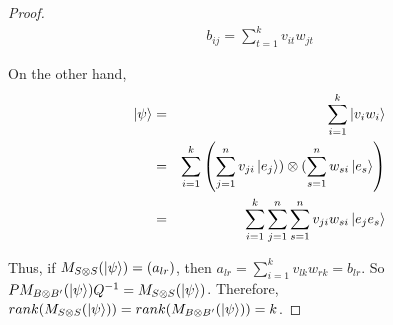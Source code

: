 \begin{proof}
\begin{comment}
=\begin{pmatrix}
\ket{v_1} && \ket{v_2} && \hdots && \ket{v_n}
\end{pmatrix}
\begin{pmatrix}
\text{---} && \ket{w_1}^T &&\text{---} \\
\text{---} && \ket{w_2}^T &&\text{---} \\
\vdots && \vdots && \vdots \\
\text{---} && \ket{w_k}^T &&\text{---} \\
\text{---} && 0 &&\text{---}
\end{pmatrix}\\
=\begin{pmatrix}
v_{11}w_{11}+\hdots+v_{1k}w_{1k} && v_{11}w_{21}+\hdots+v_{1k}w_{2k} && \hdots && v_{11}w_{n1}+\hdots+v_{1k}w_{nk}\\
v_{21}w_{11}+\hdots+v_{2k}w_{1k} && v_{21}w_{21}+\hdots+v_{2k}w_{2k} && \hdots && v_{21}w_{n1}+\hdots+v_{2k}w_{nk}\\
\vdots && \vdots && \vdots && \vdots\\
v_{n1}w_{11}+\hdots+v_{nk}w_{1k} && v_{n1}w_{21}+\hdots+v_{nk}w_{2k} && \hdots && v_{n1}w_{n1}+\hdots+v_{nk}w_{nk}
\end{pmatrix}

\end{comment}
\begin{gather*}
    b_{ij}=\sum_{t=1}^k v_{it}w_{jt}
\end{gather*}


On the other hand,
\begin{eqnarray*}
\ket{\psi}&=&\sum_{i=1}^k \ket{v_i w_i}\\
&=&\sum_{i=1}^k \left(\sum_{j=1}^{n} v_{ji} \ket{e_j}) \otimes (\sum_{s=1}^n w_{si}\ket{e_s}\right)\\
&=&\sum_{i=1}^k \sum_{j=1}^{n} \sum_{s=1}^n v_{ji} w_{si} \ket{e_j e_s}\\
\end{eqnarray*}

\noindent
Thus, if $M_{S \otimes S}(\ket{\psi})=(a_{lr})$, then $a_{lr}=\sum_{i=1}^k v_{lk} w_{rk}=b_{lr}$.
So $PM_{B \otimes B'}(\ket{\psi})Q^{-1}=M_{S \otimes S}(\ket{\psi})$.  Therefore, $rank(M_{S \otimes S}(\ket{\psi}))=rank(M_{B \otimes B'}(\ket{\psi}))=k$.
\end{proof}

